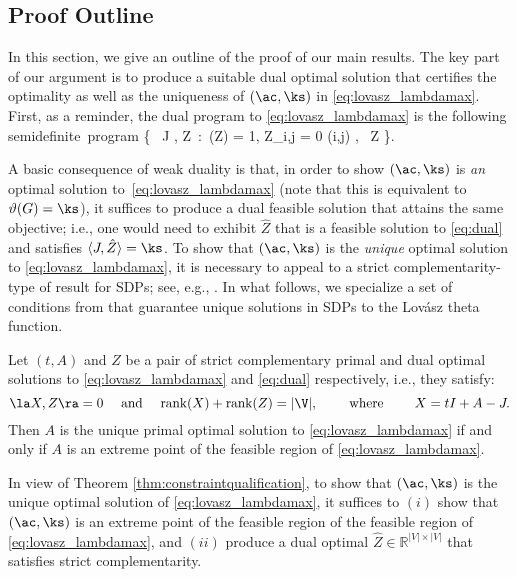\subsection{Proof Outline} \label{sec:outline}

In this section, we give an outline of the proof of our main results.  The key part of our argument is to produce a suitable dual optimal solution that certifies the optimality as well as the uniqueness of $(\ac,\ks)$ in \eqref{eq:lovasz_lambdamax}.  First, as a reminder, the dual program to \eqref{eq:lovasz_lambdamax} is the following semidefinite~program
\beq\label{eq:dual}
\max \Big\{ \, \langle J , Z \rangle \,:\, (Z) = 1, Z_{i,j} = 0  {(i,j) \in {}}, \ Z   \Big\}.
\eeq

A basic consequence of weak duality is that, in order to show $(\ac,\ks)$ is {\em an} optimal solution to~\eqref{eq:lovasz_lambdamax} (note that this is equivalent to $\vartheta(G) = \ks$), it suffices to produce a dual feasible solution that attains the same objective; i.e., one would need to exhibit $\hat{Z}$ that is a feasible solution to \eqref{eq:dual} and satisfies $\langle J, \hat{Z} \rangle = \ks$. To show that $(\ac,\ks)$ is the {\em unique} optimal solution to \eqref{eq:lovasz_lambdamax},  it is necessary to appeal to a strict complementarity-type of result for SDPs; see, e.g., \cite{overton,LV}.  In what follows, we specialize a set of conditions from \cite{LV} that guarantee unique solutions in SDPs to the Lov\'asz theta function.

\begin{theorem}\label{thm:constraintqualification}
Let $(t,A)$ and ${Z}$ be a pair of strict complementary primal and dual optimal solutions to \eqref{eq:lovasz_lambdamax} and \eqref{eq:dual} respectively, i.e., they satisfy:
$$\la X , Z \ra = 0 \quad \text{ and } \quad \mathrm{rank}(X) + \mathrm{rank}(Z) = |\V|, \qquad \text{ where } \qquad X = tI + A - J. $$  
Then $A$ is the unique primal optimal solution to \eqref{eq:lovasz_lambdamax} if and only if $A$ is an extreme point of the feasible region of \eqref{eq:lovasz_lambdamax}.
\end{theorem}
In view of Theorem \ref{thm:constraintqualification}, to show that $(\ac,\ks)$ is the unique optimal solution of \eqref{eq:lovasz_lambdamax}, it suffices to $(i)$ show that $(\ac,\ks)$ is an extreme point of the feasible region of the feasible region of \eqref{eq:lovasz_lambdamax}, and $(ii) $ produce a dual optimal $\hat{Z} \in \mathbb{R}^{|V| \times |V|}$ that satisfies strict complementarity.


